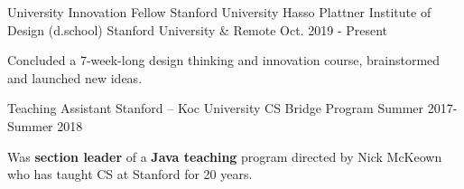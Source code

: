 \begin{cventries}
\vspace{-1mm}
  \cvopenentry
    {University Innovation Fellow} %
    {Stanford University Hasso Plattner Institute of Design (d.school) } %
    {Stanford University \& Remote} %
    {Oct. 2019 - Present} %
    {
    \begin{cvopenitems} %
        \item {Concluded a 7-week-long design thinking and innovation course, brainstormed and launched new ideas.}
     \end{cvopenitems}
    }
  \cvopenentry
    {Teaching Assistant } %
    {Stanford – Koc University CS Bridge Program} %
    {} %
    {Summer 2017-Summer 2018} %
    {
      \begin{cvopenitems} %
        \item {Was \textbf{section leader} of a \textbf{Java teaching} program directed by Nick McKeown who has taught CS at Stanford for 20 years.}
      \end{cvopenitems}
    }


\end{cventries}
